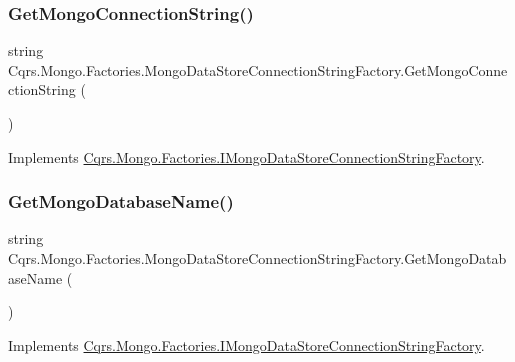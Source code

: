\subsubsection{\texorpdfstring{Get\+Mongo\+Connection\+String()}{GetMongoConnectionString()}}
{\footnotesize\ttfamily string Cqrs.\+Mongo.\+Factories.\+Mongo\+Data\+Store\+Connection\+String\+Factory.\+Get\+Mongo\+Connection\+String (\begin{DoxyParamCaption}{ }\end{DoxyParamCaption})}



Implements \hyperlink{interfaceCqrs_1_1Mongo_1_1Factories_1_1IMongoDataStoreConnectionStringFactory_ad8ea94d071ebedf6b137a0b99c2cc12c_ad8ea94d071ebedf6b137a0b99c2cc12c}{Cqrs.\+Mongo.\+Factories.\+I\+Mongo\+Data\+Store\+Connection\+String\+Factory}.

\mbox{\label{classCqrs_1_1Mongo_1_1Factories_1_1MongoDataStoreConnectionStringFactory_a7f330359f2db5b86ad28ac7d8a4c49f1_a7f330359f2db5b86ad28ac7d8a4c49f1}} 
\subsubsection{\texorpdfstring{Get\+Mongo\+Database\+Name()}{GetMongoDatabaseName()}}
{\footnotesize\ttfamily string Cqrs.\+Mongo.\+Factories.\+Mongo\+Data\+Store\+Connection\+String\+Factory.\+Get\+Mongo\+Database\+Name (\begin{DoxyParamCaption}{ }\end{DoxyParamCaption})}



Implements \hyperlink{interfaceCqrs_1_1Mongo_1_1Factories_1_1IMongoDataStoreConnectionStringFactory_a90de27c2bf23d7f9412d55c09ab2ec8c_a90de27c2bf23d7f9412d55c09ab2ec8c}{Cqrs.\+Mongo.\+Factories.\+I\+Mongo\+Data\+Store\+Connection\+String\+Factory}.



